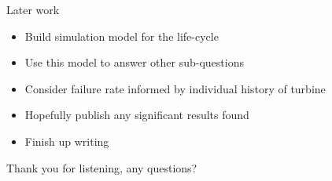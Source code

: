 \documentclass{beamer}
\begin{document}
\begin{frame}{Later work}
\begin{itemize}
\item Build simulation model for the life-cycle
\item Use this model to answer other sub-questions
\item Consider failure rate informed by individual history of turbine
\end{itemize}

\bigskip

\begin{itemize}
\item Hopefully publish any significant results found
\item Finish up writing
\end{itemize}

\bigskip

\pause
\begin{center}
 Thank you for listening, any questions?
\end{center}
\end{frame}
\end{document}
